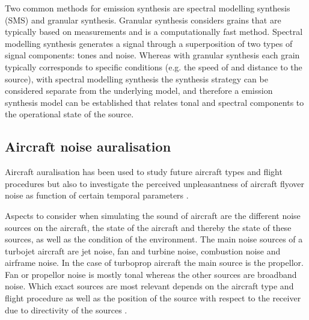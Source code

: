 Two common methods for emission synthesis are spectral modelling synthesis (SMS)
and granular synthesis. Granular synthesis considers grains that are typically
based on measurements and is a computationally fast method. Spectral modelling
synthesis generates a signal through a superposition of two types of signal
components: tones and noise. Whereas with granular synthesis each grain
typically corresponds to specific conditions (e.g. the speed of and distance to
the source), with spectral modelling synthesis the synthesis strategy can be
considered separate from the underlying model, and therefore a emission
synthesis model can be established that relates tonal and spectral components to
the operational state of the source.


\subsection{Aircraft noise auralisation} 

Aircraft auralisation has been used to study future aircraft types
\cite{Rizzi2013,Rizzi2016,Rizzi2016a} and flight procedures \cite{Sahai2016} but
also to investigate the perceived unpleasantness of aircraft flyover noise as
function of certain temporal parameters \cite{Pate2017}.

Aspects to consider when simulating the sound of aircraft are the different
noise sources on the aircraft, the state of the aircraft and thereby the state
of these sources, as well as the condition of the environment.
The main noise sources of a turbojet aircraft are jet noise, fan and turbine
noise, combustion noise and airframe noise. In the case of turboprop aircraft
the main source is the propellor\cite{Zaporozhets2011}. Fan or propellor noise
is mostly tonal whereas the other sources are broadband noise.
Which exact sources are most relevant depends on the aircraft type and flight
procedure as well as the position of the source with respect to the receiver due
to directivity of the sources \cite{Bertsch2015}.

